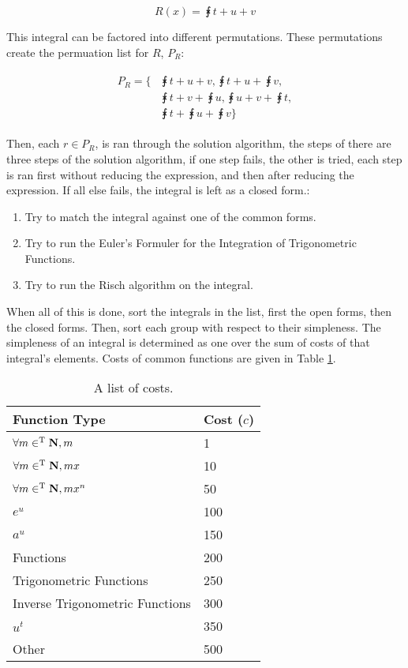 \documentclass[11pt,a4paper]{book}
\begin{document}
\begin{equation}
R(x) = \intx{t + u + v}
\end{equation}

This integral can be factored into different permutations. These permutations create the permuation list for $R$, $P_R$:

\begin{align}
\begin{split}
P_R =\Bigg\lbrace &\intx{t + u + v}, \intx{t + u} + \intx{v},\\
&\intx{t + v} + \intx{u}, \intx{u + v} + \intx{t},\\
&\intx{t} + \intx{u} + \intx{v} \Bigg\rbrace
\end{split}
\end{align}

Then, each $r \in P_R$, is ran through the solution algorithm, the steps of there are three steps of the solution algorithm, if one step fails, the other is tried, each step is ran first without reducing the expression, and then after reducing the expression. If all else fails, the integral is left as a closed form.:

\begin{enumerate}
\item Try to match the integral against one of the common forms.
\item Try to run the Euler's Formuler for the Integration of Trigonometric Functions.
\item Try to run the Risch algorithm on the integral.
\end{enumerate}

When all of this is done, sort the integrals in the list, first the open forms, then the closed forms. Then, sort each group with respect to their simpleness. The simpleness of an integral is determined as one over the sum of costs of that integral's elements. Costs of common functions are given in Table \ref{tab:costs}.

\begin{table}[httb]
\label{tab:costs}
\begin{tabular}{ll}
\toprule
Function Type & Cost ($c$) \\
\midrule
$\forall m \in^\text{T} \mathbf{N}, m$ & 1\\
$\forall m \in^\text{T} \mathbf{N}, mx$ & 10\\
$\forall m \in^\text{T} \mathbf{N}, mx^n$ &  50\\
$e^u$ & 100 \\
$a^u$ & 150 \\
Functions & 200 \\
Trigonometric Functions & 250 \\
Inverse Trigonometric Functions & 300 \\
$u^t$ & 350 \\
Other & 500\\
\bottomrule
\end{tabular}
\caption{A list of costs.}
\end{table}
\end{document}
